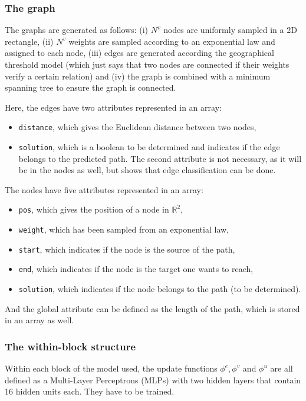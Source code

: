 \documentclass{article}
\begin{document}
        \subsubsection{The graph}

The graphs are generated as follows: (i) $N^v$ nodes are uniformly sampled in a 2D rectangle, (ii) $N^v$ weights are sampled according to an exponential law and assigned to each node, (iii) edges are generated according the geographical threshold model (which just says that two nodes are connected if their weights verify a certain relation) and (iv) the graph is combined with a minimum spanning tree to ensure the graph is connected.

Here, the edges have two attributes represented in an array:
\begin{itemize}
    \item \texttt{distance}, which gives the Euclidean distance between two nodes,
    \item \texttt{solution}, which is a boolean to be determined and indicates if the edge belongs to the predicted path. The second attribute is not necessary, as it will be in the nodes as well, but shows that edge classification can be done.
\end{itemize}

The nodes have five attributes represented in an array:
\begin{itemize}
    \item \texttt{pos}, which gives the position of a node in $\mathbb{R}^2$,
    \item \texttt{weight}, which has been sampled from an exponential law,
    \item \texttt{start}, which indicates if the node is the source of the path,
    \item \texttt{end}, which indicates if the node is the target one wants to reach,
    \item \texttt{solution}, which indicates if the node belongs to the path (to be determined).
\end{itemize}

And the global attribute can be defined as the length of the path, which is stored in an array as well.
        \subsubsection{The within-block structure}
        
Within each block of the model used, the update functions $\phi^e, \phi^v$ and $\phi^u$ are all defined as a Multi-Layer Perceptrons (MLPs) with two hidden layers that contain 16 hidden units each. They have to be trained.
\end{document}
